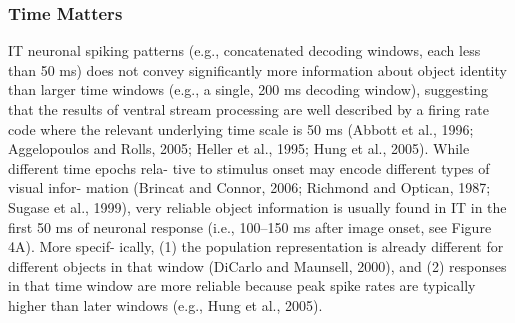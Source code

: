 \subsubsection{Time Matters}
IT neuronal spiking patterns (e.g., concatenated decoding
windows, each less than 50 ms) does not convey significantly
more information about object identity than larger time windows
(e.g., a single, 200 ms decoding window), suggesting that the
results of ventral stream processing are well described by a firing
rate code where the relevant underlying time scale is 50 ms
(Abbott et al., 1996; Aggelopoulos and Rolls, 2005; Heller
et al., 1995; Hung et al., 2005). While different time epochs rela-
tive to stimulus onset may encode different types of visual infor-
mation (Brincat and Connor, 2006; Richmond and Optican,
1987; Sugase et al., 1999), very reliable object information is
usually found in IT in the first 50 ms of neuronal response
(i.e., 100–150 ms after image onset, see Figure 4A). More specif-
ically, (1) the population representation is already different for
different objects in that window (DiCarlo and Maunsell, 2000),
and (2) responses in that time window are more reliable because
peak spike rates are typically higher than later windows (e.g.,
Hung et al., 2005).







